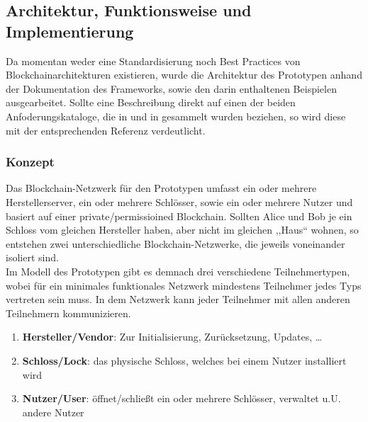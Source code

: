 \subsection{Architektur, Funktionsweise und Implementierung}
\label{sec:prototype_arch} 
    Da momentan weder eine Standardisierung noch Best Practices von Blockchainarchitekturen existieren, wurde die Architektur des Prototypen anhand der Dokumentation des Frameworks\cite{ComposerDocs}, sowie den darin enthaltenen Beispielen ausgearbeitet. 
    Sollte eine Beschreibung direkt auf einen der beiden Anfoderungskataloge, die in  und in  gesammelt wurden beziehen, so wird diese mit der entsprechenden Referenz verdeutlicht.
    
    \subsubsection{Konzept}
        Das Blockchain-Netzwerk für den Prototypen umfasst ein oder mehrere Herstellerserver, ein oder mehrere Schlösser, sowie ein oder mehrere Nutzer und basiert auf einer private/permissioined Blockchain. 
        Sollten Alice und Bob je ein Schloss vom gleichen Hersteller haben, aber nicht im gleichen ,,Haus`` wohnen, so entstehen zwei unterschiedliche Blockchain-Netzwerke, die jeweils voneinander isoliert sind.
        \smallskip\\
        \noindent Im Modell des Prototypen gibt es demnach drei verschiedene Teilnehmertypen, wobei für ein minimales funktionales Netzwerk mindestens Teilnehmer jedes Typs vertreten sein muss. 
        In dem Netzwerk kann jeder Teilnehmer mit allen anderen Teilnehmern kommunizieren.
        \begin{enumerate}[noitemsep]
            \item \textbf{Hersteller/Vendor}: Zur Initialisierung, Zurücksetzung, Updates, \dots
            \item \textbf{Schloss/Lock}: das physische Schloss, welches bei einem Nutzer installiert wird
            \item \textbf{Nutzer/User}: öffnet/schließt ein oder mehrere Schlösser, verwaltet u.U. andere Nutzer
        \end{enumerate}
        
